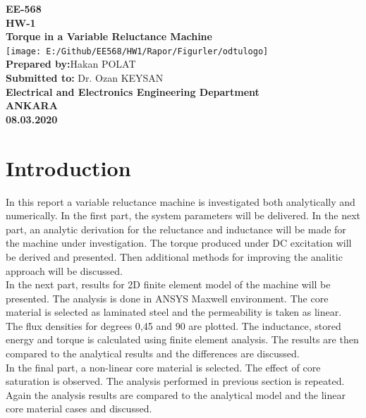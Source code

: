 \documentclass{article}
\begin{document}
\begin{titlepage}
	\begin{center}
		\Huge\textbf{EE-568 }\\
		\vspace{0.5cm}
		\Huge\textbf{HW-1}\\
		\vspace{0.5cm}
		\Huge\textbf{Torque in a Variable Reluctance Machine}\\
		\vspace{0.5cm}
		\texttt{[image: E:/Github/EE568/HW1/Rapor/Figurler/odtulogo]}\\
		
		
		\Large\textbf{Prepared by:}Hakan POLAT\\
		
		\Large\textbf{Submitted to:} Dr. Ozan KEYSAN\\
		\vspace{0.5cm}
		\Large\textbf{Electrical and Electronics Engineering Department}\\
		
		\large\textbf{ANKARA	}\\
		\large\textbf{08.03.2020}\\
		
		
		
	\end{center}
	
	

\end{titlepage}

\newpage
\section{Introduction}
In this report a variable reluctance machine is investigated both analytically and numerically. In the first part, the system parameters will be delivered. In the next part, an analytic derivation for the reluctance and inductance will be made for the machine under investigation. The torque produced under DC excitation will be derived and presented. Then additional methods for improving the analitic approach will be discussed.\\
In the next part, results for 2D finite element model of the machine will be presented. The analysis is done in ANSYS Maxwell environment. The core material is selected as laminated steel and the permeability is taken as linear. The flux densities for degrees 0,45 and 90 are plotted. The inductance, stored energy and torque is calculated using finite element analysis. The results are then compared to the analytical results and the differences are discussed. \\
In the final part, a non-linear core material is selected. The effect of core saturation is observed. The analysis performed in previous section is repeated. Again the analysis results are compared to the analytical model and the linear core material cases and discussed.
\end{document}
